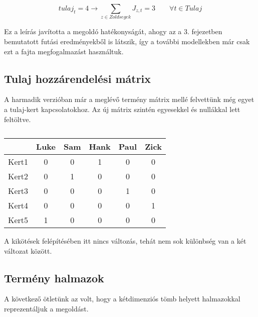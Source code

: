 \documentclass[12pt,a4paper,twoside, openright]{report}
\begin{document}
    \begin{equation}
    tulaj_t=4 \rightarrow \sum_{z\in Zoldsegek} J_{z,t} =3 \qquad \forall t\in Tulaj
    \end{equation}

    Ez a leírás javította a megoldó hatékonyságát, ahogy az a 3. fejezetben bemutatott futási eredményekből is látszik, így a további modellekben már csak ezt a fajta megfogalmazást 
    használtuk.


\subsection{Tulaj hozzárendelési mátrix}

    A harmadik verzióban már a meglévő termény mátrix mellé felvettünk még egyet a tulaj-kert kapcsolatokhoz.
    Az új mátrix szintén egyesekkel és nullákkal lett feltöltve.
	
	\begin{table}
		\centering
		\caption{}
		\begin{tabular}{|c|c|c|c|c|c|}
			\hline 
			& Luke & Sam & Hank & Paul & Zick \\ 
			\hline 
			Kert1 & 0 & 0 & 1 & 0 & 0 \\ 
			\hline 
			Kert2 & 0 & 1 & 0 & 0 & 0 \\ 
			\hline 
			Kert3 & 0 & 0 & 0 & 1 & 0 \\ 
			\hline 
			Kert4 & 0 & 0 & 0 & 0 & 1 \\ 
			\hline 
			Kert5 & 1 & 0 & 0 & 0 & 0 \\ 
			\hline 
		\end{tabular}
	\end{table}
     

    A kikötések felépítésében itt nincs változás, tehát nem sok különbség van a két változat között.

\subsection{Termény halmazok}

    A következő ötletünk az volt, hogy a kétdimenziós tömb helyett halmazokkal reprezentáljuk a megoldást.
\end{document}

